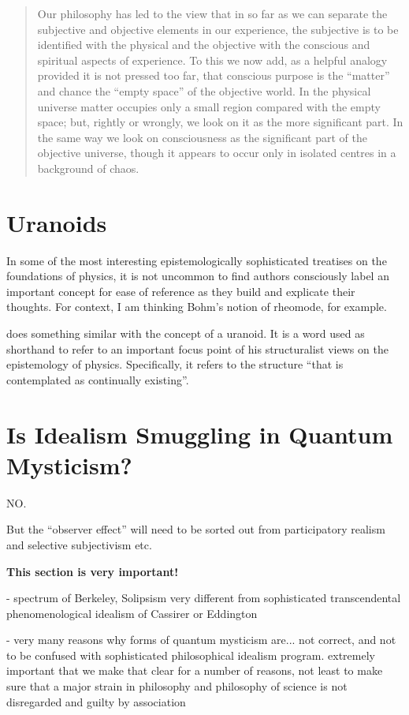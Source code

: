 \begin{quote}
    Our philosophy has led to the view that in so far as we can separate the subjective and objective elements in our experience, the subjective is to be identified with the physical and the objective with the conscious and spiritual aspects of experience.  To this we now add, as a helpful analogy provided it is not pressed too far, that conscious purpose is the ``matter'' and chance the ``empty space'' of the objective world.  In the physical universe matter occupies only a small region compared with the empty space; but, rightly or wrongly, we look on it as the more significant part.  In the same way we look on consciousness as the significant part of the objective universe, though it appears to occur only in isolated centres in a background of chaos.  \citep[p. 180-184]{Eddington1939}
\end{quote}




\section{Uranoids}

In some of the most interesting epistemologically sophisticated treatises on the foundations of physics, it is not uncommon to find authors consciously label an important concept for ease of reference as they build and explicate their thoughts.  For context, I am thinking Bohm's notion of rheomode, for example.

\cite{Eddington1939} does something similar with the concept of a uranoid.  It is a word used as shorthand to refer to an important focus point of his structuralist views on the epistemology of physics.  Specifically, it refers to the structure ``that is contemplated as continually existing''.  \citep[p. 166]{Eddington1939}

\section{Is Idealism Smuggling in Quantum Mysticism?}

NO.

But the ``observer effect'' will need to be sorted out from participatory realism and selective subjectivism etc.

\textbf{This section is very important!}

- spectrum of Berkeley, Solipsism very different from sophisticated transcendental phenomenological idealism of Cassirer or Eddington  

- very many reasons why forms of quantum mysticism are... not correct, and not to be confused with sophisticated philosophical idealism program.  extremely important that we make that clear for a number of reasons, not least to make sure that a major strain in philosophy and philosophy of science is not disregarded and guilty by association












